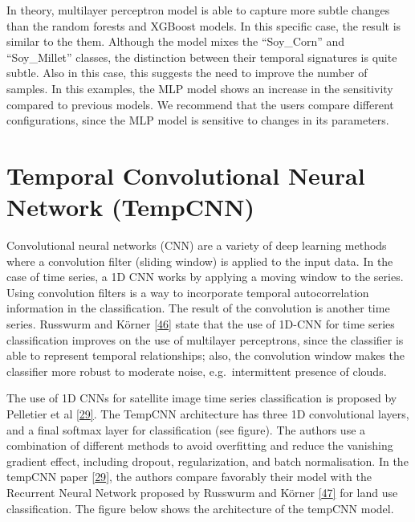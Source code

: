 \documentclass[
  11pt,
]{report}
\begin{document}
In theory, multilayer perceptron model is able to capture more subtle
changes than the random forests and XGBoost models. In this specific
case, the result is similar to the them. Although the model mixes the
``Soy\_Corn'' and ``Soy\_Millet'' classes, the distinction between their
temporal signatures is quite subtle. Also in this case, this suggests
the need to improve the number of samples. In this examples, the MLP
model shows an increase in the sensitivity compared to previous models.
We recommend that the users compare different configurations, since the
MLP model is sensitive to changes in its parameters.

\hypertarget{temporal-convolutional-neural-network-tempcnn}{%
\section*{Temporal Convolutional Neural Network
(TempCNN)}\label{temporal-convolutional-neural-network-tempcnn}}

Convolutional neural networks (CNN) are a variety of deep learning
methods where a convolution filter (sliding window) is applied to the
input data. In the case of time series, a 1D CNN works by applying a
moving window to the series. Using convolution filters is a way to
incorporate temporal autocorrelation information in the classification.
The result of the convolution is another time series. Russwurm and
Körner \protect\hyperlink{ref-Russwurm2017}{{[}46{]}} state that the use
of 1D-CNN for time series classification improves on the use of
multilayer perceptrons, since the classifier is able to represent
temporal relationships; also, the convolution window makes the
classifier more robust to moderate noise, e.g.~intermittent presence of
clouds.

The use of 1D CNNs for satellite image time series classification is
proposed by Pelletier et al
\protect\hyperlink{ref-Pelletier2019}{{[}29{]}}. The TempCNN
architecture has three 1D convolutional layers, and a final softmax
layer for classification (see figure). The authors use a combination of
different methods to avoid overfitting and reduce the vanishing gradient
effect, including dropout, regularization, and batch normalisation. In
the tempCNN paper \protect\hyperlink{ref-Pelletier2019}{{[}29{]}}, the
authors compare favorably their model with the Recurrent Neural Network
proposed by Russwurm and Körner
\protect\hyperlink{ref-Russwurm2018}{{[}47{]}} for land use
classification. The figure below shows the architecture of the tempCNN
model.
\end{document}
